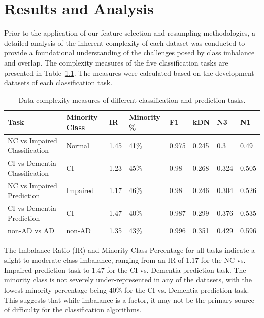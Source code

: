 \chapter{Results and Analysis}

Prior to the application of our feature selection and resampling methodologies, a detailed analysis of the inherent complexity of each dataset was conducted to provide a foundational understanding of the challenges posed by class imbalance and overlap. The complexity measures of the five classification tasks are presented in Table~\ref{table:data-complexity-tasks}. The measures were calculated based on the development datasets of each classification task.

\begin{table}[!ht]
    \centering
    \caption{Data complexity measures of different classification and prediction tasks.}
    \begin{tabular}{|p{1.75cm}|l|l|l|l|l|l|l|}
    \hline
       \textbf{Task} & \textbf{Minority Class} & \textbf{IR} & \textbf{Minority \%} & \textbf{F1} & \textbf{kDN} & \textbf{N3} & \textbf{N1} \\ \hline
        NC vs Impaired Classification & Normal & 1.45 & 41\% & 0.975 & 0.245 & 0.3 & 0.49 \\ \hline
        CI vs Dementia Classification & CI & 1.23 & 45\% & 0.98 & 0.268 & 0.324 & 0.505 \\ \hline
        NC vs Impaired Prediction & Impaired & 1.17 & 46\% & 0.98 & 0.246 & 0.304 & 0.526 \\ \hline
        CI vs Dementia Prediction & CI & 1.47 & 40\% & 0.987 & 0.299 & 0.376 & 0.535 \\ \hline
        non-AD vs AD & non-AD & 1.35 & 43\% & 0.996 & 0.351 & 0.429 & 0.596 \\ \hline
    \end{tabular}
    \label{table:data-complexity-tasks}
\end{table}

The Imbalance Ratio (\acrshort{IR}) and Minority Class Percentage for all tasks indicate a slight to moderate class imbalance, ranging from an IR of 1.17 for the NC vs. Impaired prediction task to 1.47 for the CI vs. Dementia prediction task. The minority class is not severely under-represented in any of the datasets, with the lowest minority percentage being 40\% for the CI vs. Dementia prediction task. This suggests that while imbalance is a factor, it may not be the primary source of difficulty for the classification algorithms.

